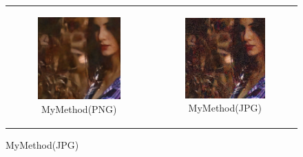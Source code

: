 \begin{figure}
\begin{tabular}{cc}
    \begin{subfigure}{0.3\textwidth}
      \includegraphics[width=\linewidth]{inc/research/formats/denoised_mycnn_png.png}
      \caption{MyMethod(PNG)}
    \end{subfigure} &
    \begin{subfigure}{0.3\textwidth}
      \includegraphics[width=\linewidth]{inc/research/formats/denoised_mycnn_jpg.png}
      \caption{MyMethod(JPG)}
    \end{subfigure} \\
    

\end{tabular}
\end{figure}
